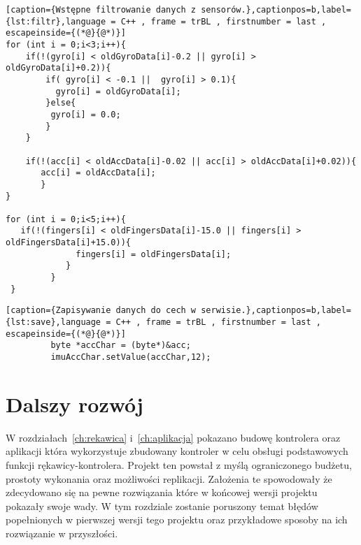\begin{lstlisting}[caption={Wstępne filtrowanie danych z sensorów.},captionpos=b,label={lst:filtr},language = C++ , frame = trBL , firstnumber = last , escapeinside={(*@}{@*)}]
for (int i = 0;i<3;i++){
	if(!(gyro[i] < oldGyroData[i]-0.2 || gyro[i] > oldGyroData[i]+0.2)){
		if( gyro[i] < -0.1 ||  gyro[i] > 0.1){              
	      gyro[i] = oldGyroData[i];
	    }else{
	     gyro[i] = 0.0;
	    }
	}
	            
	if(!(acc[i] < oldAccData[i]-0.02 || acc[i] > oldAccData[i]+0.02)){
	   acc[i] = oldAccData[i];
	   }
}

for (int i = 0;i<5;i++){
   if(!(fingers[i] < oldFingersData[i]-15.0 || fingers[i] > oldFingersData[i]+15.0)){
              fingers[i] = oldFingersData[i];
            }
         }         
 }
\end{lstlisting}

\begin{lstlisting}[caption={Zapisywanie danych do cech w serwisie.},captionpos=b,label={lst:save},language = C++ , frame = trBL , firstnumber = last , escapeinside={(*@}{@*)}]
         byte *accChar = (byte*)&acc;
         imuAccChar.setValue(accChar,12);
\end{lstlisting}

\section{Dalszy rozwój}
\label{sec:rozwoj}
 W rozdziałach~\ref{ch:rekawica} i~\ref{ch:aplikacja} pokazano budowę kontrolera oraz aplikacji która wykorzystuje zbudowany kontroler w celu obsługi podstawowych funkcji rękawicy-kontrolera. Projekt ten powstał z myślą ograniczonego budżetu, prostoty wykonania oraz możliwości replikacji. Założenia te spowodowały że zdecydowano się na pewne rozwiązania które w końcowej wersji projektu pokazały swoje wady. W tym rozdziale zostanie poruszony temat błędów popełnionych w pierwszej wersji tego projektu oraz przykładowe sposoby na ich rozwiązanie w przyszłości. 
 
